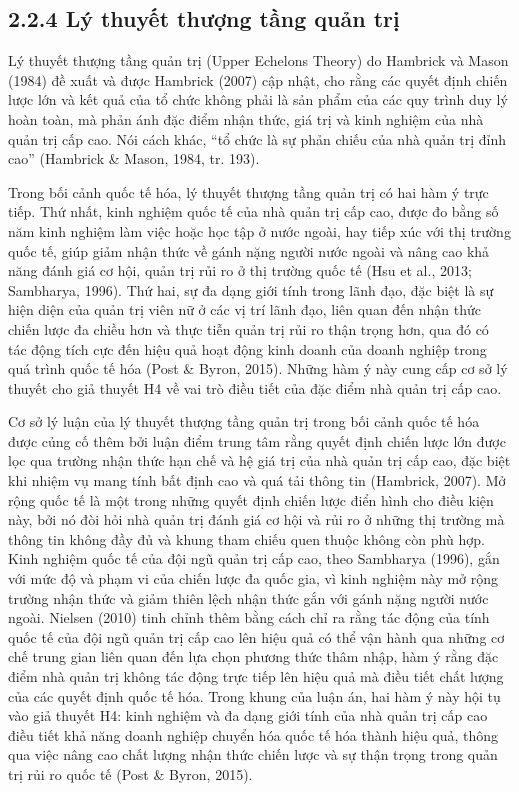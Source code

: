 \documentclass[
  a4paper,
  13pt]{extreport}
\begin{document}
\hypertarget{luxfd-thuyux1ebft-thux1b0ux1ee3ng-tux1ea7ng-quux1ea3n-trux1ecb}{%
\subsection{2.2.4 Lý thuyết thượng tầng quản
trị}\label{luxfd-thuyux1ebft-thux1b0ux1ee3ng-tux1ea7ng-quux1ea3n-trux1ecb}}

Lý thuyết thượng tầng quản trị (Upper Echelons Theory) do Hambrick và
Mason (1984) đề xuất và được Hambrick (2007) cập nhật, cho rằng các
quyết định chiến lược lớn và kết quả của tổ chức không phải là sản phẩm
của các quy trình duy lý hoàn toàn, mà phản ánh đặc điểm nhận thức, giá
trị và kinh nghiệm của nhà quản trị cấp cao. Nói cách khác, ``tổ chức là
sự phản chiếu của nhà quản trị đỉnh cao'' (Hambrick \& Mason, 1984, tr.
193).

Trong bối cảnh quốc tế hóa, lý thuyết thượng tầng quản trị có hai hàm ý
trực tiếp. Thứ nhất, kinh nghiệm quốc tế của nhà quản trị cấp cao, được
đo bằng số năm kinh nghiệm làm việc hoặc học tập ở nước ngoài, hay tiếp
xúc với thị trường quốc tế, giúp giảm nhận thức về gánh nặng người nước
ngoài và nâng cao khả năng đánh giá cơ hội, quản trị rủi ro ở thị trường
quốc tế (Hsu et al., 2013; Sambharya, 1996). Thứ hai, sự đa dạng giới
tính trong lãnh đạo, đặc biệt là sự hiện diện của quản trị viên nữ ở các
vị trí lãnh đạo, liên quan đến nhận thức chiến lược đa chiều hơn và thực
tiễn quản trị rủi ro thận trọng hơn, qua đó có tác động tích cực đến
hiệu quả hoạt động kinh doanh của doanh nghiệp trong quá trình quốc tế
hóa (Post \& Byron, 2015). Những hàm ý này cung cấp cơ sở lý thuyết cho
giả thuyết H4 về vai trò điều tiết của đặc điểm nhà quản trị cấp cao.

Cơ sở lý luận của lý thuyết thượng tầng quản trị trong bối cảnh quốc tế
hóa được củng cố thêm bởi luận điểm trung tâm rằng quyết định chiến lược
lớn được lọc qua trường nhận thức hạn chế và hệ giá trị của nhà quản trị
cấp cao, đặc biệt khi nhiệm vụ mang tính bất định cao và quá tải thông
tin (Hambrick, 2007). Mở rộng quốc tế là một trong những quyết định
chiến lược điển hình cho điều kiện này, bởi nó đòi hỏi nhà quản trị đánh
giá cơ hội và rủi ro ở những thị trường mà thông tin không đầy đủ và
khung tham chiếu quen thuộc không còn phù hợp. Kinh nghiệm quốc tế của
đội ngũ quản trị cấp cao, theo Sambharya (1996), gắn với mức độ và phạm
vi của chiến lược đa quốc gia, vì kinh nghiệm này mở rộng trường nhận
thức và giảm thiên lệch nhận thức gắn với gánh nặng người nước ngoài.
Nielsen (2010) tinh chỉnh thêm bằng cách chỉ ra rằng tác động của tính
quốc tế của đội ngũ quản trị cấp cao lên hiệu quả có thể vận hành qua
những cơ chế trung gian liên quan đến lựa chọn phương thức thâm nhập,
hàm ý rằng đặc điểm nhà quản trị không tác động trực tiếp lên hiệu quả
mà điều tiết chất lượng của các quyết định quốc tế hóa. Trong khung của
luận án, hai hàm ý này hội tụ vào giả thuyết H4: kinh nghiệm và đa dạng
giới tính của nhà quản trị cấp cao điều tiết khả năng doanh nghiệp
chuyển hóa quốc tế hóa thành hiệu quả, thông qua việc nâng cao chất
lượng nhận thức chiến lược và sự thận trọng trong quản trị rủi ro quốc
tế (Post \& Byron, 2015).
\end{document}
